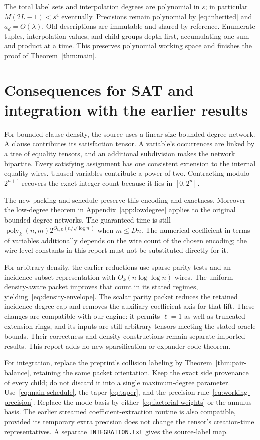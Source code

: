 \documentclass[11pt,letterpaper]{article}
\theoremstyle{remark}\newtheorem{remark}[theorem]{Remark}
\newcommand{\poly}{\operatorname{poly}}
\begin{document}
The total label sets and interpolation degrees are polynomial in $s$;
in particular $M(2L-1)<s^4$ eventually. Precisions remain polynomial by
\eqref{eq:inherited} and $a_d=O(\lambda)$. Old descriptions are immutable
and shared by reference. Enumerate tuples, interpolation values, and
child groups depth first, accumulating one sum and product at a time.
This preserves polynomial working space and finishes the proof of
Theorem~\ref{thm:main}.



\section{Consequences for SAT and integration with the earlier results}
\label{sec:sat}
For bounded clause density, the source uses a linear-size bounded-degree
network. A clause contributes its satisfaction tensor. A variable's
occurrences are linked by a tree of equality tensors, and an additional
subdivision makes the network bipartite. Every satisfying assignment has
one consistent extension to the internal equality wires. Unused variables
contribute a power of two. Contracting modulo $2^{n+1}$ recovers the exact
integer count because it lies in $[0,2^n]$.

The new packing and schedule preserve this encoding and exactness.
Moreover the low-degree theorem in Appendix~\ref{app:lowdegree} applies
to the original bounded-degree networks. The guaranteed time is still
$\poly_k(n,m)2^{O_{k,D}(n/\sqrt{\log n})}$ when $m\le Dn$.
The numerical coefficient in terms of variables additionally depends
on the wire count of the chosen encoding; the wire-level constants in
this report must not be substituted directly for it.

For arbitrary density, the earlier reductions use sparse parity tests
and an incidence subset representation with $O_k(n\log\log n)$ wires.
The uniform density-aware packet improves that count in its stated
regimes, yielding~\eqref{eq:density-envelope}. The scalar parity packet
reduces the retained incidence-degree cap and removes the auxiliary
coefficient axis for that lift. These changes are compatible with our
engine: it permits $\ell=1$ as well as truncated extension rings, and its
inputs are still arbitrary tensors meeting the stated oracle bounds.
Their correctness and density constructions remain separate imported
results. This report adds no new sparsification or expander-code theorem.

For integration, replace the preprint's collision labeling by
Theorem~\ref{thm:pair-balance}, retaining the same packet orientation.
Keep the exact side provenance of every child; do not discard it into a
single maximum-degree parameter. Use~\eqref{eq:main-schedule}, the taper
\eqref{eq:taper}, and the precision rule~\eqref{eq:working-precision}.
Replace the mode basis by either~\eqref{eq:factorial-weights} or the
annulus basis. The earlier streamed coefficient-extraction routine is
also compatible, provided its temporary extra precision does not change
the tensor's creation-time representatives. A separate
\texttt{INTEGRATION.txt} gives the source-label map.
\end{document}
